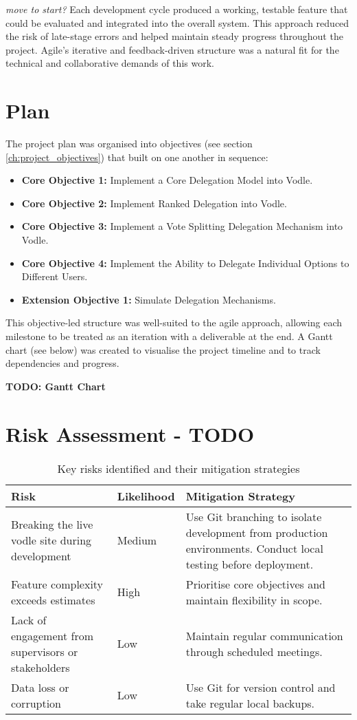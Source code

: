 \textit{move to start?}
Each development cycle produced a working, testable feature that could be evaluated and integrated into the overall system. This approach reduced the risk of late-stage errors and helped maintain steady progress throughout the project. Agile's iterative and feedback-driven structure was a natural fit for the technical and collaborative demands of this work.
\section{Plan}

The project plan was organised into objectives (see section \ref{ch:project_objectives}) that built on one another in sequence:

\begin{itemize}
    \item \textbf{Core Objective 1:} Implement a Core Delegation Model into Vodle.
    \item \textbf{Core Objective 2:} Implement Ranked Delegation into Vodle.
    \item \textbf{Core Objective 3:} Implement a Vote Splitting Delegation Mechanism into Vodle.
    \item \textbf{Core Objective 4:} Implement the Ability to Delegate Individual Options to Different Users.
    \item \textbf{Extension Objective 1:} Simulate Delegation Mechanisms.
\end{itemize}

This objective-led structure was well-suited to the agile approach, allowing each milestone to be treated as an iteration with a deliverable at the end. A Gantt chart (see below) was created to visualise the project timeline and to track dependencies and progress.

\textbf{TODO: Gantt Chart}
\section{Risk Assessment - TODO}
\begin{table}[H]
\centering
\begin{tabular}{|p{4.5cm}|p{2cm}|p{8cm}|}
\hline
\textbf{Risk} & \textbf{Likelihood} & \textbf{Mitigation Strategy} \\
\hline
Breaking the live vodle site during development & Medium & Use Git branching to isolate development from production environments. Conduct local testing before deployment. \\
\hline
Feature complexity exceeds estimates & High & Prioritise core objectives and maintain flexibility in scope. \\
\hline
Lack of engagement from supervisors or stakeholders & Low & Maintain regular communication through scheduled meetings. \\
\hline
Data loss or corruption & Low & Use Git for version control and take regular local backups. \\
\hline
\end{tabular}
\caption{Key risks identified and their mitigation strategies}\label{tab:risk-assessment}
\end{table}

